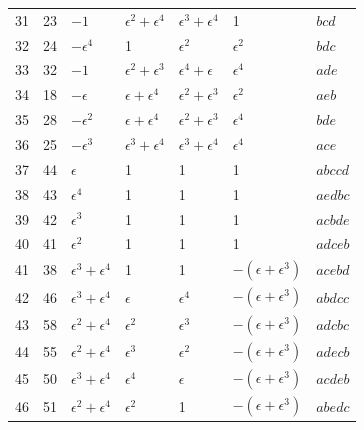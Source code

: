 \documentclass[11pt,a4paper]{article}
\begin{document}
\begin{center}
\begin{longtable}{r|r|l|l|l|l|l}
31 & 23 & $-1$                       & $\epsilon^{2} + \epsilon^{4}$
                                     & $\epsilon^{3} + \epsilon^{4}$
                              & 1 & $bcd$\\
32 & 24 & $-\epsilon^{4}$            & 1 & $\epsilon^{2}$
                              & $\epsilon^{2}$ & $bdc$\\
33 & 32 & $-1$ & $\epsilon^{2} + \epsilon^{3}$ & $\epsilon^{4} + \epsilon$
                              & $\epsilon^{4}$ & $ade$\\
34 & 18 & $-\epsilon$ & $\epsilon + \epsilon^{4}$
                                     & $\epsilon^{2} + \epsilon^{3}$
                              & $\epsilon^{2}$ & $aeb$\\
35 & 28 & $-\epsilon^{2}$            & $\epsilon + \epsilon^{4}$
                                     & $\epsilon^{2} + \epsilon^{3}$
                              & $\epsilon^{4}$ & $bde$\\
36 & 25 & $-\epsilon^{3}$            & $\epsilon^{3} + \epsilon^{4}$
                                     & $\epsilon^{3} + \epsilon^{4}$
                              & $\epsilon^{4}$ & $ace$\\
37 & 44 & $\epsilon$ & 1 & 1 & 1 & $abccd$\\
38 & 43 & $\epsilon^{4}$ & 1 & 1 & 1 & $aedbc$\\
39 & 42 & $\epsilon^{3}$ & 1 & 1 & 1 & $acbde$\\
40 & 41 & $\epsilon^{2}$ & 1 & 1 & 1 & $adceb$\\
41 & 38 & $\epsilon^{3} + \epsilon^{4}$ & 1 & 1
                                     & $-(\epsilon + \epsilon^{3})$ & $acebd$\\
42 & 46 & $\epsilon^{3} + \epsilon^{4}$ & $\epsilon$ & $\epsilon^{4}$
                                     & $-(\epsilon + \epsilon^{3})$ & $abdcc$\\
43 & 58 & $\epsilon^{2} + \epsilon^{4}$ & $\epsilon^{2}$ & $\epsilon^{3}$
                                     & $-(\epsilon + \epsilon^{3})$ & $adcbc$\\
44 & 55 & $\epsilon^{2} + \epsilon^{4}$ & $\epsilon^{3}$ & $\epsilon^{2}$
                                     & $-(\epsilon + \epsilon^{3})$ & $adecb$\\
45 & 50 & $\epsilon^{3} + \epsilon^{4}$ & $\epsilon^{4}$ & $\epsilon$
                                     & $-(\epsilon + \epsilon^{3})$ & $acdeb$\\
46 & 51 & $\epsilon^{2} + \epsilon^{4}$ & $\epsilon^{2}$ & 1
                                     & $-(\epsilon + \epsilon^{3})$ & $abedc$\\

\end{longtable}
\end{center}
\end{document}

